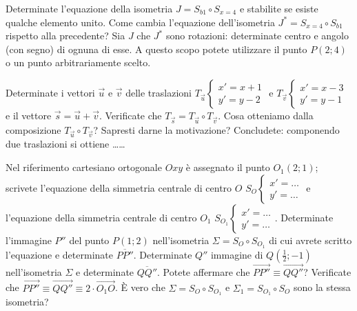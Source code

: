 \begin{esercizio}
  \label{ese:8.73} %
  Determinate l'equazione della isometria \(J=S_{b1} \circ S_{x=4}\) e 
  stabilite se esiste qualche elemento unito. Come cambia l'equazione 
  dell'isometria \(J^*=S_{x=4} \circ S_{b1}\) rispetto alla precedente? 
  Sia \(J\) che \(J^*\) sono rotazioni: determinate centro e angolo (con 
  segno) di ognuna di esse. A questo scopo potete utilizzare il punto 
  \(P(2;4)\) o un punto arbitrariamente scelto.
\end{esercizio}

\begin{esercizio}
  \label{ese:8.77} %
  Determinate i vettori \(\vec{u}\) e \(\vec{v}\) delle traslazioni 
  \(T_{\vec{u}}\begin{cases}x'=x+1\\y'=y-2\end{cases}\) e 
  \(T_{\vec{v}}\begin{cases}x'=x-3\\y'=y-1\end{cases}\) e il vettore 
  \(\vec{s} = \vec{u} + \vec{v}\). Verificate che \(T_{\vec{s}} = 
  T_{\vec{u}} \circ T_{\vec{v}}\).
  Cosa otteniamo dalla composizione \(T_{\vec{u}} \circ T_{\vec{v}}\)? 
  Sapresti darne la motivazione?
  Concludete: componendo due traslazioni si ottiene \ldots\ldots{}
\end{esercizio}

\begin{esercizio}
  \label{ese:8.78} %
  Nel riferimento cartesiano ortogonale \(Oxy\) è assegnato il punto 
  \(O_1(2;1)\); scrivete l'equazione della simmetria centrale di centro 
  \(O\) \(S_O\begin{cases}x'=\ldots{}\\y'=\ldots{}\end{cases}\)  e 
  l'equazione della simmetria centrale di centro \(O_1\) 
  \(S_{O_1}\begin{cases}x'=\ldots{}\\y'=\ldots{}\end{cases}\). 
  Determinate l'immagine \(P''\) del punto \(P(1;2)\) nell'isometria 
  \(\Sigma=S_O \circ S_{O_1}\) di cui avrete scritto l'equazione e 
  determinate \(\overline{PP''}\). Determinate \(Q''\) immagine di 
  \(Q\left(\frac{1}{2};-1\right)\) nell'isometria \(\Sigma\) e determinate 
  \(\overline{QQ''}\). Potete affermare che \(\overrightarrow{PP''} \equiv 
  \overrightarrow{QQ''}\)? Verificate che \(\overrightarrow{PP''} \equiv 
  \overrightarrow{QQ''} \equiv 2\cdot \overrightarrow{O_1O}\).
  \`E vero che \(\Sigma=S_O \circ S_{O_1}\) e \(\Sigma_1=S_{O_1} \circ 
  S_{O}\) sono la stessa isometria?
\end{esercizio}

